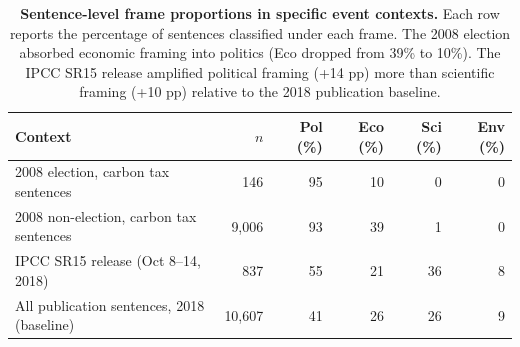 \begin{table}[h]
\centering
\renewcommand{\arraystretch}{1.15}
\caption{\textbf{Sentence-level frame proportions in specific event contexts.}
Each row reports the percentage of sentences classified under each frame.
The 2008 election absorbed economic framing into politics
(Eco dropped from 39\% to 10\%). The IPCC SR15 release amplified
political framing (+14 pp) more than scientific framing (+10 pp)
relative to the 2018 publication baseline.}
\label{tab:si_sentence_framing}
\vspace{0.3em}
\small
\begin{tabular}{@{}l r r r r r@{}}
\toprule
Context & $n$ & Pol (\%) & Eco (\%) & Sci (\%) & Env (\%) \\
\midrule
2008 election, carbon tax sentences & 146 & 95 & 10 & 0 & 0 \\
2008 non-election, carbon tax sentences & 9,006 & 93 & 39 & 1 & 0 \\
IPCC SR15 release (Oct 8--14, 2018) & 837 & 55 & 21 & 36 & 8 \\
All publication sentences, 2018 (baseline) & 10,607 & 41 & 26 & 26 & 9 \\
\bottomrule
\end{tabular}
\end{table}